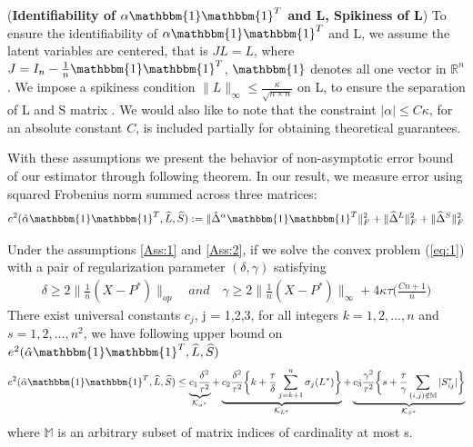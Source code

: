 \documentclass[AMS,STIX1COL]{WileyNJD-v2}
\begin{document}
\begin{assumption} (\textbf{Identifiability of $\alpha\mathbbm{1}\mathbbm{1}^T$ and L, Spikiness of L}) \label{Ass:2}
To ensure the identifiability of $\alpha\mathbbm{1}\mathbbm{1}^T$ and L, we assume the latent variables are centered, that is $JL=L$, where $J=I_{n}-\frac{1}{n}\mathbbm{1}\mathbbm{1}^T$, $\mathbbm{1}$ denotes all one vector in $\mathbb{R}^{n}$. We impose a spikiness condition $\|L\|_{\infty}\leq\frac{\kappa}{\sqrt{n \times n}}$ on L, to ensure the separation of L and S matrix \cite{agarwal2012noisy}. We would also like to note that the constraint $|\alpha|\leq C\kappa$, for an absolute constant $C$, is included partially for obtaining theoretical guarantees.
\end{assumption}

With these assumptions we present the behavior of non-asymptotic error bound of our estimator through following theorem. In our result, we measure error using squared Frobenius norm summed across three matrices:
\[
    e^{2}(\hat{\alpha}\mathbbm{1}\mathbbm{1}^T,\widehat{L},\widehat{S}):=\|\hat{\Delta}^{\alpha}\mathbbm{1}\mathbbm{1}^T\|_{F}^{2} + \|\widehat{\Delta}^{L}\|_{F}^{2} + \|\widehat{\Delta}^{S}\|_{F}^{2}
\]

\begin{theorem} \label{Th:th1}
Under the assumptions \ref{Ass:1} and \ref{Ass:2},
if we solve the convex problem (\ref{eq:1}) with a pair of regularization parameter $(\delta,\gamma)$ satisfying
\begin{align} \label{eq:49}
\delta \geq 2\|\frac{1}{n}(X-P^{*})\|_{op} \quad and \quad \gamma \geq 2\|\frac{1}{n}(X-P^{*})\|_{\infty}+4\kappa\tau\bigg(\frac{Cn+1}{n} \bigg)
\end{align}
There exist universal constants $c_{j}$, j = 1,2,3,  for all integers $k = 1,2,...,n$ and $s = 1,2,...,n^{2}$, we have following upper bound on $e^{2}(\hat{\alpha}\mathbbm{1}\mathbbm{1}^T,\widehat{L},\widehat{S})$
\begin{align}
    e^{2}(\hat{\alpha}\mathbbm{1}\mathbbm{1}^T,\widehat{L},\widehat{S}) \leq
    \underbrace{c_{1}\frac{\delta^{2}}{\tau^{2}}}
    _{\mathcal{K}_{\alpha^*}} +
    \underbrace{c_{2}\frac{\delta^{2}}{\tau^{2}}
    \bigg\{k + \frac{\tau}{\delta}\sum_{j=k+1}^{n}\sigma_{j}(L^{*})\bigg\}}_{\mathcal{K}_{L^*}} +
    \underbrace{c_{3}\frac{\gamma^{2}}{\tau^{2}}
    \bigg\{s + \frac{\tau}{\gamma}\sum_{(i,j) \notin \mathbb{M}}|S^*_{ij}|\bigg\}}_{\mathcal{K}_{S^*}}
\end{align}
where $\mathbb{M}$ is an arbitrary subset of matrix indices of cardinality at most s.
\end{theorem}
\end{document}

